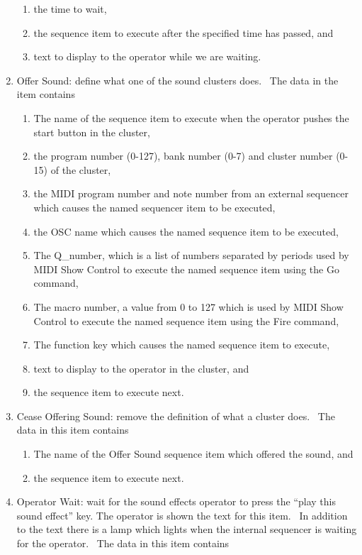 \documentclass[letterpaper]{article}
\begin{document}
\begin{enumerate}
\begin{enumerate}
\item the time to wait,
\item the sequence item to execute after the specified time has passed,
and 
\item text to display to the operator while we are waiting.
\end{enumerate}
\item Offer Sound: define what one of the sound clusters does. \ The
data in the item contains

\begin{enumerate}
\item The name of the sequence item to execute when the operator pushes
the start button in the cluster, 
\item the program number (0-127), bank number (0-7) and cluster number
(0-15) of the cluster,
\item the MIDI program number and note number from an external sequencer
which causes the named sequencer item to be executed,
\item the OSC name which causes the named sequence item to be executed,
\item The Q\_number, which is a list of numbers separated by periods
used by MIDI Show Control to execute the named sequence item using the
Go command,
\item The macro number, a value from 0 to 127 which is used by MIDI Show
Control to execute the named sequence item using the Fire command,
\item The function key which causes the named sequence item to execute,
\item text to display to the operator in the cluster, and
\item the sequence item to execute next.
\end{enumerate}
\item Cease Offering Sound: remove the definition of what a cluster
does. \ The data in this item contains

\begin{enumerate}
\item The name of the Offer Sound sequence item which offered the sound,
and
\item the sequence item to execute next.
\end{enumerate}
\item Operator Wait: wait for the sound effects operator to press the
“play this sound effect” key. The operator is shown the text for this
item. \ In addition to the text there is a lamp which lights when the
internal sequencer is waiting for the operator. \ The data in this item
contains


\end{enumerate}
\end{document}

